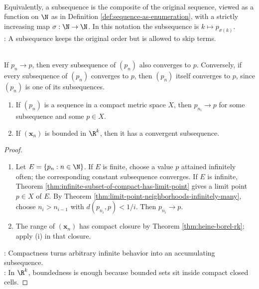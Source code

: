 \begin{remark} \label{rem:subsequence-selection-map} \\
Equivalently, a subsequence is the composite of the original sequence, viewed as a function on $\N$ as in Definition \ref{def:sequence-as-enumeration}, with a strictly increasing map $\sigma:\N\to\N$. In this notation the subsequence is $k\mapsto p_{\sigma(k)}$.\\
: A subsequence keeps the original order but is allowed to skip terms.
\end{remark}

\begin{remark} \label{rem:subsequences-of-convergent-sequences} \\
If $p_n\to p$, then every subsequence of $(p_n)$ also converges to $p$. Conversely, if every subsequence of $(p_n)$ converges to $p$, then $(p_n)$ itself converges to $p$, since $(p_n)$ is one of its subsequences.
\end{remark}

\begin{theorem} \label{thm:compact-sequential-subsequence} 
\begin{enumerate}[label=(\roman*)]
\setlength{\itemsep}{0pt}
\item If $(p_n)$ is a sequence in a compact metric space $X$, then $p_{n_i}\to p$ for some subsequence and some $p\in X$.
\item If $(\mathbf{x}_n)$ is bounded in $\R^k$, then it has a convergent subsequence.
\end{enumerate}
\begin{proof}
\begin{enumerate}[label=(\roman*)]
\setlength{\itemsep}{0pt}
\item Let $E=\{p_n:n\in\N\}$. If $E$ is finite, choose a value $p$ attained infinitely often; the corresponding constant subsequence converges. If $E$ is infinite, Theorem \ref{thm:infinite-subset-of-compact-has-limit-point} gives a limit point $p\in X$ of $E$. By Theorem \ref{thm:limit-point-neighborhoods-infinitely-many}, choose $n_i>n_{i-1}$ with $d(p_{n_i},p)<1/i$. Then $p_{n_i}\to p$.
\item The range of $(\mathbf{x}_n)$ has compact closure by Theorem \ref{thm:heine-borel-rk}; apply (i) in that closure.
\end{enumerate}
: Compactness turns arbitrary infinite behavior into an accumulating subsequence.\\
: In $\R^k$, boundedness is enough because bounded sets sit inside compact closed cells.
\end{proof}
\end{theorem}

